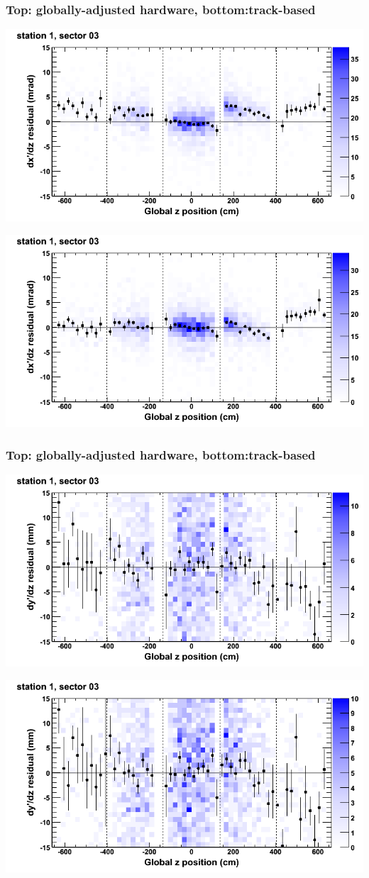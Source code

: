 \documentclass[compress]{beamer}
\begin{document}
\begin{frame}
\frametitle{Top: globally-adjusted hardware, bottom:track-based}
\includegraphics[width=0.7\linewidth]{NOV4_mapplots_HW/DTvsz_st1sec03_dxdz.png}

\includegraphics[width=0.7\linewidth]{NOV4_mapplots/DTvsz_st1sec03_dxdz.png}
\end{frame}

\begin{frame}
\frametitle{Top: globally-adjusted hardware, bottom:track-based}
\includegraphics[width=0.7\linewidth]{NOV4_mapplots_HW/DTvsz_st1sec03_dydz.png}

\includegraphics[width=0.7\linewidth]{NOV4_mapplots/DTvsz_st1sec03_dydz.png}
\end{frame}
\end{document}
